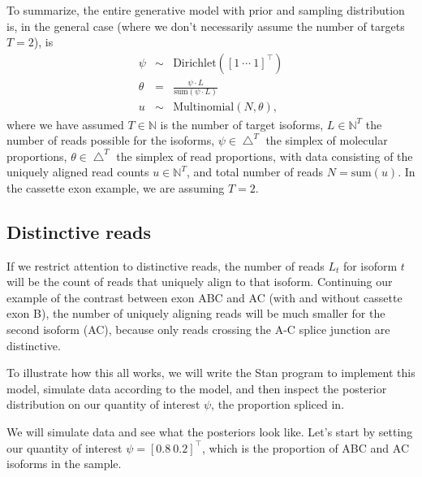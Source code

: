 \documentclass[11pt]{report}
\newcommand{\vect}[1]{[#1]^{\top}}
\newcommand{\rdistro}[2]{\textrm{#1}\!\left( #2 \right)}
\begin{document}
To summarize, the entire generative model with prior and sampling
distribution is, in the general case (where we don't
necessarily assume the number of targets $T = 2$), is
\begin{eqnarray*}
  \psi & \sim & \rdistro{Dirichlet}{\vect{1 \ \cdots \ 1}}
  \\[4pt]
  \theta & = & \frac{\displaystyle \psi \cdot L}
               {\displaystyle \textrm{sum}(\psi \cdot L)}
  \\[4pt]
  u & \sim & \rdistro{Multinomial}{N, \theta},
\end{eqnarray*}
where we have assumed $T \in \mathbb{N}$ is the number of target
isoforms, $L \in \mathbb{N}^T$ the number of reads possible for the
isoforms, $\psi \in \bigtriangleup^T$ the simplex of molecular
proportions, $\theta \in \bigtriangleup^T$ the simplex of read
proportions, with data consisting of the uniquely aligned read counts
$u \in \mathbb{N}^T$, and total number of reads $N = \textrm{sum}(u)$.
In the cassette exon example, we are assuming $T = 2$.


\subsection{Distinctive reads}

If we restrict attention to distinctive reads, the number of reads
$L_t$ for isoform $t$ will be the count of reads that uniquely align
to that isoform.  Continuing our example of the contrast between exon
ABC and AC (with and without cassette exon B), the number of uniquely
aligning reads will be much smaller for the second isoform (AC),
because only reads crossing the A-C splice junction are distinctive.

To illustrate how this all works, we will write the Stan program to
implement this model, simulate data according to the model, and then
inspect the posterior distribution on our quantity of interest $\psi$,
the proportion spliced in.

We will simulate data and see what the posteriors look like.  Let's
start by setting our quantity of interest $\psi = \vect{0.8 \ 0.2}$,
which is the proportion of ABC and AC isoforms in the sample.
\end{document}
